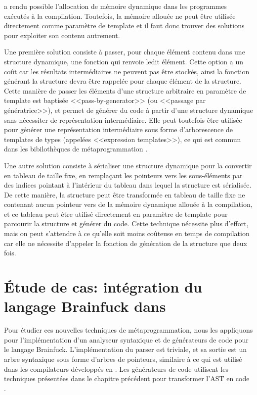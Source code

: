 \documentclass[main]{subfiles}
\begin{document}
 a rendu possible l'allocation de m\'emoire dynamique dans les programmes
\cpp ex\'ecut\'es \`a la compilation. Toutefois, la m\'emoire allou\'ee
ne peut \^etre utilis\'ee directement comme param\`etre de template et
il faut donc trouver des solutions pour exploiter son contenu autrement.

Une premi\`ere solution consiste \`a passer, pour chaque \'el\'ement contenu
dans une structure dynamique, une fonction qui renvoie ledit \'el\'ement.
Cette option a un co\^ut car les r\'esultats interm\'ediaires ne peuvent pas
\^etre stock\'es, ainsi la fonction g\'en\'erant la structure devra \^etre
rappel\'ee pour chaque \'el\'ement de la structure. Cette mani\`ere de passer
les \'el\'ements d'une structure arbitraire en param\`etre de template est
baptis\'ee <<pass-by-generator>> (ou <<passage par g\'en\'eratrice>>),
et permet de g\'en\'erer du code \`a partir
d'une structure dynamique sans n\'ecessiter de repr\'esentation interm\'ediaire.
Elle peut toutefois \^etre utilis\'ee pour g\'en\'erer une repr\'esentation
interm\'ediaire sous forme d'arborescence de templates de types (appel\'ees
<<expression templates>>), ce qui est commun dans les bibiloth\`eques de
m\'etaprogrammation \cpp.

Une autre solution consiste \`a s\'erialiser une structure dynamique pour
la convertir en tableau de taille fixe, en rempla\c{c}ant les pointeurs vers
les sous-\'el\'ements par des indices pointant \`a l'int\'erieur du tableau
dans lequel la structure est s\'erialis\'ee. De cette mani\`ere, la structure
peut \^etre transform\'ee en tableau de taille fixe ne contenant aucun pointeur
vers de la m\'emoire dynamique allou\'ee \`a la compilation, et ce tableau
peut \^etre utilis\'e directement en param\`etre de template pour parcourir
la structure et g\'en\'erer du code.
Cette technique n\'ecessite plus d'effort, mais on peut s'attendre \`a
ce qu'elle soit moins co\^uteuse en temps de compilation car elle ne n\'ecessite
d'appeler la fonction de g\'en\'eration de la structure que deux fois.

\section{
  \'Etude de cas: int\'egration du langage Brainfuck dans \cpp
}

Pour \'etudier ces nouvelles techniques de m\'etaprogrammation,
nous les appliquons pour l'impl\'ementation d'un analyseur syntaxique et
de g\'en\'erateurs de code pour le langage Brainfuck.
L'impl\'ementation du parser est triviale, et sa sortie est un arbre syntaxique
sous forme d'arbres de pointeurs, similaire \`a ce qui est utilis\'e dans les
compilateurs d\'evelopp\'es en \cpp.
Les g\'en\'erateurs de code utilisent les techniques pr\'esent\'ees
dans le chapitre pr\'ec\'edent pour transformer l'AST en code \cpp.
\end{document}
